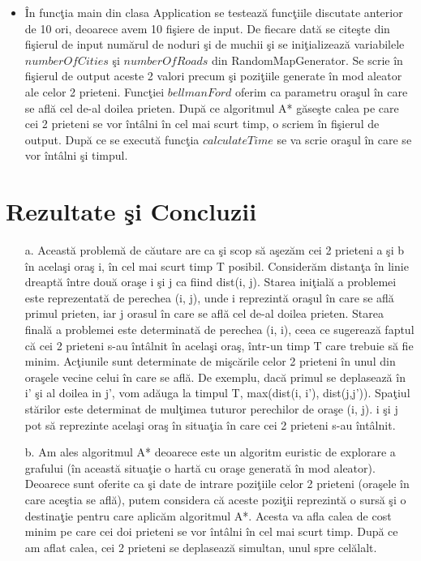 \documentclass{article}
\begin{document}
\begin{itemize}
    \item \^{I}n func\c{t}ia main din clasa Application se testeaz\u{a} func\c{t}iile discutate anterior de 10 ori, deoarece avem 10 fi\c{s}iere de input. De fiecare dat\u{a} se cite\c{s}te din fi\c{s}ierul de input num\u{a}rul de noduri \c{s}i de muchii \c{s}i se ini\c{t}ializeaz\u{a} variabilele $numberOfCities$ \c{s}i $numberOfRoads$ din RandomMapGenerator. Se scrie \^{i}n fi\c{s}ierul de output aceste 2 valori precum \c{s}i pozi\c{t}iile generate \^{i}n mod aleator ale celor 2 prieteni. Func\c{t}iei $bellmanFord$ oferim ca parametru ora\c{s}ul \^{i}n care se afl\u{a} cel de-al doilea prieten. Dup\u{a} ce algoritmul A* g\u{a}se\c{s}te calea pe care cei 2 prieteni se vor \^{i}nt\^{a}lni \^{i}n cel mai scurt timp, o scriem \^{i}n fi\c{s}ierul de output. Dup\u{a} ce se execut\u{a} func\c{t}ia $calculateTime$ se va scrie ora\c{s}ul \^{i}n care se vor \^{i}nt\^{a}lni \c{s}i timpul.
\end{itemize}

\section{Rezultate \c{s}i Concluzii}
\begin{itemize}
    \item[a.] Aceast\u{a} problem\u{a} de c\u{a}utare are ca \c{s}i scop s\u{a} a\c{s}ez\u{a}m cei 2 prieteni a \c{s}i b \^{i}n acela\c{s}i ora\c{s} i, \^{i}n cel mai scurt timp T posibil. Consider\u{a}m distan\c{t}a \^{i}n linie dreapt\u{a} \^{i}ntre dou\u{a} ora\c{s}e i \c{s}i j ca fiind dist(i, j). Starea ini\c{t}ial\u{a} a problemei este reprezentat\u{a} de perechea (i, j), unde i reprezint\u{a} ora\c{s}ul \^{i}n care se afl\u{a} primul prieten, iar j orasul \^{i}n care se afl\u{a} cel de-al doilea prieten. Starea final\u{a} a problemei este determinat\u{a} de perechea (i, i), ceea ce sugereaz\u{a} faptul c\u{a} cei 2 prieteni s-au \^{i}nt\^{a}lnit \^{i}n acela\c{s}i ora\c{s}, \^{i}ntr-un timp T care trebuie s\u{a} fie minim. Ac\c{t}iunile sunt determinate de mi\c{s}c\u{a}rile celor 2 prieteni \^{i}n unul din ora\c{s}ele vecine celui \^{i}n care se afl\u{a}. De exemplu, dac\u{a} primul se deplaseaz\u{a} \^{i}n i' \c{s}i al doilea in j', vom ad\u{a}uga la timpul T, max(dist(i, i'), dist(j,j')). Spa\c{t}iul st\u{a}rilor este determinat de mul\c{t}imea tuturor perechilor de ora\c{s}e (i, j). i \c{s}i j pot s\u{a} reprezinte acela\c{s}i ora\c{s} \^{i}n situa\c{t}ia \^{i}n care cei 2 prieteni s-au \^{i}nt\^{a}lnit.
    \item [b.] Am ales algoritmul A* deoarece este un algoritm euristic de explorare a grafului (\^{i}n aceast\u{a} situa\c{t}ie o hart\u{a} cu ora\c{s}e generat\u{a} \^{i}n mod aleator). Deoarece sunt oferite ca \c{s}i date de intrare pozi\c{t}iile celor 2 prieteni (ora\c{s}ele \^{i}n care ace\c{s}tia se afl\u{a}), putem considera c\u{a} aceste pozi\c{t}ii reprezint\u{a} o surs\u{a} \c{s}i o destina\c{t}ie pentru care aplic\u{a}m algoritmul A*. Acesta va afla calea de cost minim pe care cei doi prieteni se vor \^{i}nt\^{a}lni \^{i}n cel mai scurt timp. Dup\u{a} ce am aflat calea, cei 2 prieteni se deplaseaz\u{a} simultan, unul spre cel\u{a}lalt.
\end{itemize}
\end{document}
